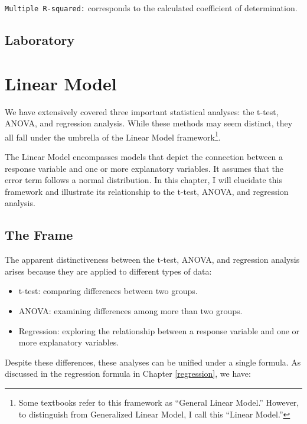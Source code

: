 \documentclass[
]{book}
\providecommand{\tightlist}{%
  \setlength{\itemsep}{0pt}\setlength{\parskip}{0pt}}
\begin{document}
\texttt{Multiple\ R-squared:} corresponds to the calculated coefficient of determination.

\hypertarget{laboratory-5}{%
\section{Laboratory}\label{laboratory-5}}

\hypertarget{linear-model}{%
\chapter{Linear Model}\label{linear-model}}

We have extensively covered three important statistical analyses: the t-test, ANOVA, and regression analysis. While these methods may seem distinct, they all fall under the umbrella of the Linear Model framework\footnote{Some textbooks refer to this framework as ``General Linear Model.'' However, to distinguish from Generalized Linear Model, I call this ``Linear Model.''}.

The Linear Model encompasses models that depict the connection between a response variable and one or more explanatory variables. It assumes that the error term follows a normal distribution. In this chapter, I will elucidate this framework and illustrate its relationship to the t-test, ANOVA, and regression analysis.

\hypertarget{the-frame}{%
\section{The Frame}\label{the-frame}}

The apparent distinctiveness between the t-test, ANOVA, and regression analysis arises because they are applied to different types of data:

\begin{itemize}
\tightlist
\item
  t-test: comparing differences between two groups.
\item
  ANOVA: examining differences among more than two groups.
\item
  Regression: exploring the relationship between a response variable and one or more explanatory variables.
\end{itemize}

Despite these differences, these analyses can be unified under a single formula. As discussed in the regression formula in Chapter \ref{regression}, we have:
\end{document}
